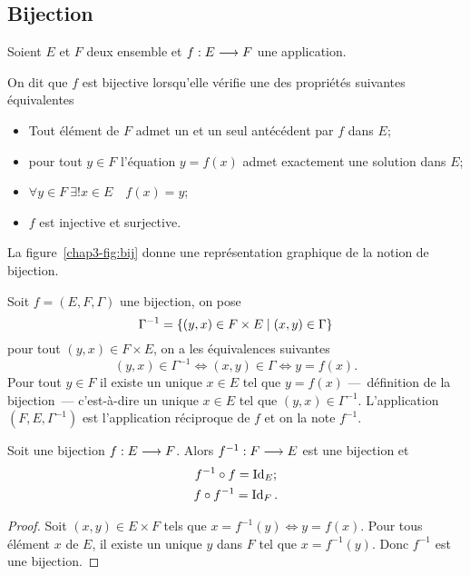 \subsection{Bijection}\label{chap3-subsubsec:bijection}

Soient \(E\) et \(F\) deux ensemble et \(f:E \longrightarrow{} F\) une application.
\begin{defdef}
  On dit que \(f\) est bijective lorsqu'elle vérifie une des propriétés
  suivantes équivalentes
  \begin{itemize}
    \item Tout élément de \(F\) admet un et un seul antécédent par \(f\)
      dans \(E\);
    \item pour tout \(y \in{}F\) l'équation \(y = f(x)\) admet exactement une
      solution dans \(E\);
    \item \(\forall{}y \in{}F \ \exists! x \in{}E \quad f(x) = y\);
    \item \(f\) est injective et surjective.
  \end{itemize}
  La figure~\ref{chap3-fig:bij} donne une représentation graphique de la
  notion de bijection.
\end{defdef}

Soit \(f = (E, F, \Gamma)\) une bijection, on pose
\begin{equation}
  \Gamma^{-1} = \left\{(y,x) \in{}F \times E\mathrel{}\middle|\mathrel{}(x,y) \in{}\Gamma\right\}
\end{equation}
pour tout \((y,x) \in{}F \times E\), on a les équivalences suivantes
\begin{equation}
  (y, x) \in{}\Gamma^{-1} \iff{}(x, y) \in{}\Gamma \iff{}y = f(x).
\end{equation}
Pour tout \(y \in{}F\) il existe un unique \(x \in{}E\) tel que \(y = f(x)\)
---~définition de la bijection~--- c'est-à-dire un unique \(x \in{}E\) tel que
\((y,x) \in{}\Gamma^{-1}\). L'application \((F,E,\Gamma^{-1})\) est l'application
réciproque de \(f\) et on la note \(f^{-1}\).

\begin{prop} Soit une bijection \(f:E \longrightarrow{} F\). Alors
  \(f^{-1}:F \longrightarrow{} E\) est une bijection et
  \begin{gather}
    f^{-1} \circ f  = \operatorname{Id}_E; \\
    f \circ f^{-1} = \operatorname{Id}_F.
  \end{gather}
\end{prop}

\begin{proof}
  Soit \((x, y) \in{}E \times F\) tels que \(x = f^{-1}(y) \iff{}y = f(x)\). Pour
  tous élément \(x\) de \(E\), il existe un unique \(y\) dans \(F\) tel que
  \(x = f^{-1}(y)\). Donc \(f^{-1}\) est une bijection.
\end{proof}

